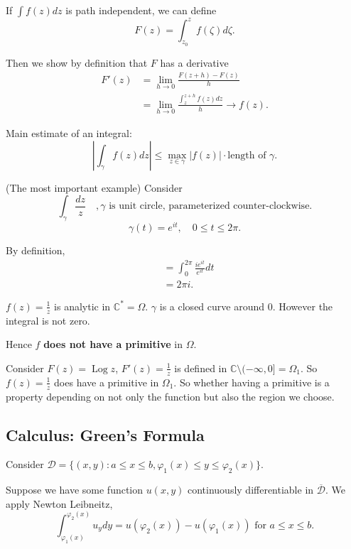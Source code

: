 If $\int f(z) dz $ is path independent, we can define \[
	F(z) = \int _{z_0}^z f(\zeta)d\zeta
.\] 

Then we show by definition that $F$ has a derivative 
\begin{align*}
	F'(z) &= \lim_{h \to 0} \frac{F(z+h) - F(z)}{h}\\
	&= \lim_{h \to 0} \frac{\int _z^{z+h}f(z) dz }{h}\to f(z)
.\end{align*} 


\begin{lemma}
	Main estimate of an integral:
\[
	\left| \int _\gamma f(z) dz  \right| \le \max_{z \in \gamma} \left| f(z) \right| \cdot \text{length of }\gamma
.\] 
\end{lemma}


\begin{example}(The most important example)
	Consider
	\[
		\int _\gamma \frac{dz }{z} \quad, \gamma \text{ is unit circle, parameterized counter-clockwise}
	.\] 
	\[
		\gamma(t) = e^{it },\quad 0\le t\le 2\pi
	.\] 
	
	By definition,
	\begin{align*}
		&=\int _0^{2 \pi} \frac{i e^{it }}{e^{it }} dt\\
		&= 2 \pi i
	.\end{align*} 

	$f(z) = \frac{1}{z}$ is analytic in $\mathbb{C}^* = \Omega$. 
	$\gamma$ is a closed curve around $0$. However the integral is not zero.

	Hence $f$ \textbf{does not have a primitive} in $\Omega$.

	Consider $F(z) = \operatorname{Log} z$, $F'(z) = \frac{1}{z}$ is defined in $\mathbb{C} \setminus  (-\infty, 0] = \Omega_1$. 
	So $f(z) = \frac{1}{z}$ does have a primitive in $\Omega_1$. So whether having a primitive is a property depending on not only the function but also the region we choose.
\end{example}

\subsection{Calculus: Green's Formula}

Consider $\mathcal{D} = \{(x,y): a \le x\le b, \varphi_1(x)\le y\le \varphi_2(x)\} $.

Suppose we have some function $u(x,y)$ continuously differentiable in $\overline{\mathcal{D}} $. We apply Newton Leibneitz,
\[
	\int_{\varphi_1(x)}^{\varphi_2(x)}u_y dy = u(\varphi_2(x))-u(\varphi_1(x)) \text{ for } a\le x\le b
.\] 

